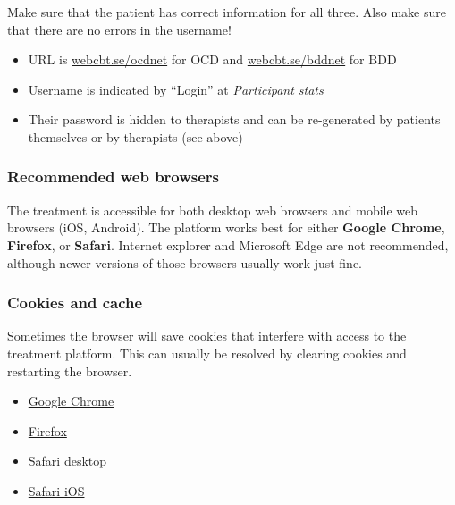 \documentclass[]{book}
\providecommand{\tightlist}{%
  \setlength{\itemsep}{0pt}\setlength{\parskip}{0pt}}
\theoremstyle{definition}
\theoremstyle{definition}
\theoremstyle{definition}
\theoremstyle{remark}
\begin{document}
Make sure that the patient has correct information for all three. Also
make sure that there are no errors in the username!

\begin{itemize}
\tightlist
\item
  URL is \url{webcbt.se/ocdnet} for OCD and \url{webcbt.se/bddnet} for
  BDD
\item
  Username is indicated by ``Login'' at \emph{Participant stats}
\item
  Their password is hidden to therapists and can be re-generated by
  patients themselves or by therapists (see above)
\end{itemize}

\hypertarget{recommended-web-browsers}{%
\subsubsection{Recommended web
browsers}\label{recommended-web-browsers}}

The treatment is accessible for both desktop web browsers and mobile web
browsers (iOS, Android). The platform works best for either
\textbf{Google Chrome}, \textbf{Firefox}, or \textbf{Safari}. Internet
explorer and Microsoft Edge are not recommended, although newer versions
of those browsers usually work just fine.

\hypertarget{cookies-and-cache}{%
\subsubsection{Cookies and cache}\label{cookies-and-cache}}

Sometimes the browser will save cookies that interfere with access to
the treatment platform. This can usually be resolved by clearing cookies
and restarting the browser.

\begin{itemize}
\tightlist
\item
  \href{https://support.google.com/chrome/answer/95647?co=GENIE.Platform\%3DDesktop\&hl=en}{Google
  Chrome}
\item
  \href{https://support.mozilla.org/en-US/kb/delete-cookies-remove-info-websites-stored}{Firefox}
\item
  \href{https://support.apple.com/kb/ph21411?locale=en_US}{Safari
  desktop}
\item
  \href{https://support.apple.com/en-gb/HT201265}{Safari iOS}
\end{itemize}
\end{document}
